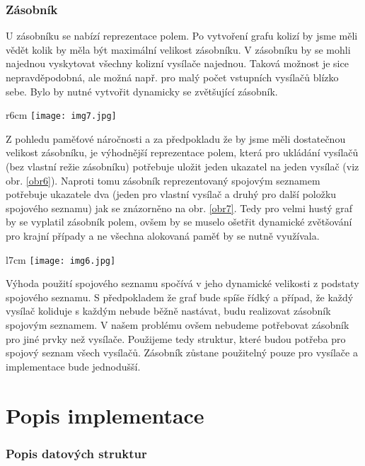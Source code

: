 \documentclass[12pt]{report}
\begin{document}
\subsection{Zásobník}
U zásobníku se nabízí reprezentace polem. Po vytvoření grafu kolizí  by jsme měli vědět kolik by měla být maximální velikost zásobníku. V zásobníku by se mohli najednou vyskytovat všechny kolizní vysílače najednou. Taková možnost je sice nepravděpodobná, ale možná např. pro malý počet vstupních vysílačů blízko sebe. Bylo by nutné vytvořit dynamicky se zvětšující zásobník. 

\begin{wrapfigure}[9]{r}{6cm}
\texttt{[image: img7.jpg]}
\caption{Zásobník polem.}
\label{obr6}
\end{wrapfigure} 
Z pohledu paměťové náročnosti a za předpokladu že by jsme měli dostatečnou velikost zásobníku, je výhodnější reprezentace polem, která pro ukládání vysílačů (bez vlastní režie zásobníku) potřebuje uložit jeden ukazatel na jeden vysílač (viz obr. \ref{obr6}). Naproti tomu zásobník reprezentovaný spojovým seznamem potřebuje ukazatele dva (jeden pro vlastní vysílač a druhý pro další položku spojového seznamu) jak se znázorněno na obr. \ref{obr7}. Tedy pro velmi hustý graf by se vyplatil zásobník polem, ovšem by se muselo ošetřit dynamické zvětšování pro krajní případy a ne všechna alokovaná paměť by se nutně využívala. 

\pagebreak
\begin{wrapfigure}[10]{l}{7cm}
\texttt{[image: img6.jpg]}
\caption{Zásobník spojovým seznamem.}
\label{obr7}
\end{wrapfigure}

Výhoda použití spojového seznamu spočívá v jeho dynamické velikosti z podstaty spojového seznamu. S předpokladem že graf bude spíše řídký a případ, že každý vysílač koliduje s každým nebude běžně nastávat, budu realizovat zásobník spojovým seznamem. V našem problému ovšem nebudeme potřebovat zásobník pro jiné prvky než vysílače. Použijeme tedy struktur, které budou potřeba pro spojový seznam všech vysílačů. Zásobník zůstane použitelný pouze pro vysílače a implementace bude jednodušší.

\chapter{Popis implementace}
\subsection{Popis datových struktur}
\end{document}
